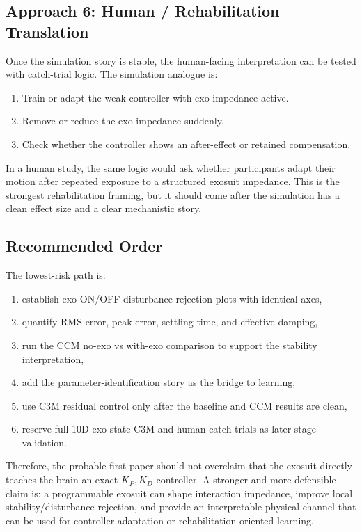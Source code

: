 \documentclass[11pt]{article}
\begin{document}
\subsection{Approach 6: Human / Rehabilitation Translation}
Once the simulation story is stable, the human-facing interpretation can be tested with catch-trial logic.  The simulation analogue is:
\begin{enumerate}[leftmargin=1.5em]
    \item Train or adapt the weak controller with exo impedance active.
    \item Remove or reduce the exo impedance suddenly.
    \item Check whether the controller shows an after-effect or retained compensation.
\end{enumerate}
In a human study, the same logic would ask whether participants adapt their motion after repeated exposure to a structured exosuit impedance.  This is the strongest rehabilitation framing, but it should come after the simulation has a clean effect size and a clear mechanistic story.

\subsection{Recommended Order}
The lowest-risk path is:
\begin{enumerate}[leftmargin=1.5em]
    \item establish exo ON/OFF disturbance-rejection plots with identical axes,
    \item quantify RMS error, peak error, settling time, and effective damping,
    \item run the CCM no-exo vs with-exo comparison to support the stability interpretation,
    \item add the parameter-identification story as the bridge to learning,
    \item use C3M residual control only after the baseline and CCM results are clean,
    \item reserve full 10D exo-state C3M and human catch trials as later-stage validation.
\end{enumerate}

Therefore, the probable first paper should not overclaim that the exosuit directly teaches the brain an exact \(K_P,K_D\) controller.  A stronger and more defensible claim is: a programmable exosuit can shape interaction impedance, improve local stability/disturbance rejection, and provide an interpretable physical channel that can be used for controller adaptation or rehabilitation-oriented learning.
\end{document}
